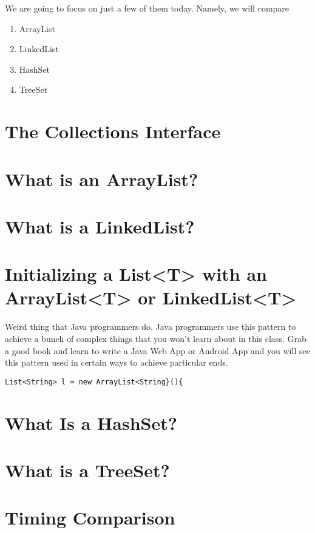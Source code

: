 \documentclass[12pt]{article}
\begin{document}
We are going to focus on just a few of them today. Namely, we will compare

\begin{enumerate}
\item ArrayList
\item LinkedList
\item HashSet
\item TreeSet
\end{enumerate}


\section{The Collections Interface}

\section{What is an ArrayList?}

\section{What is a LinkedList?}

\section{Initializing a List<T> with an ArrayList<T> or LinkedList<T>}
Weird thing that Java programmers do. Java programmers use this pattern to achieve a bunch of complex things that you won't learn about in this class. Grab a good book and learn to write a Java Web App or Android App and you will see this pattern used in certain ways to achieve particular ends.

\begin{lstlisting}
List<String> l = new ArrayList<String}(){
\end{lstlisting}

\section{What Is a HashSet?}

\section{What is a TreeSet?}


\section{Timing Comparison}
\end{document}
